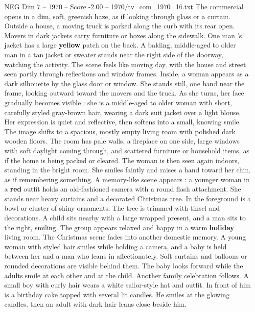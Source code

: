 \begin{textsample}{NEG Dim 7 – 1970 – Score -2.00 – 1970/tv\_com\_1970\_16.txt}  \label{ex:f7_neg_068}
The commercial opens in a dim, soft, greenish haze, as if looking through glass or a curtain.
Outside a house, a moving truck is parked along the curb with its rear open.
Movers in dark jackets carry furniture or boxes along the sidewalk.
One man ’s jacket has a large \textbf{yellow} patch on the back.
A balding, middle-aged to older man in a tan jacket or sweater stands near the right side of the doorway, watching the activity.
The scene feels like moving day, with the house and street seen partly through reflections and window frames.
Inside, a woman appears as a dark silhouette by the glass door or window.
She stands still, one hand near the frame, looking outward toward the movers and the truck.
As she turns, her face gradually becomes visible : she is a middle-aged to older woman with short, carefully styled gray-brown hair, wearing a dark suit jacket over a light blouse.
Her expression is quiet and reflective, then softens into a small, knowing smile.
The image shifts to a spacious, mostly empty living room with polished dark wooden floors.
The room has pale walls, a fireplace on one side, large windows with soft daylight coming through, and scattered furniture or household items, as if the home is being packed or cleared.
The woman is then seen again indoors, standing in the bright room.
She smiles faintly and raises a hand toward her chin, as if remembering something.
A memory-like scene appears : a younger woman in a \textbf{red} outfit holds an old-fashioned camera with a round flash attachment.
She stands near heavy curtains and a decorated Christmas tree.
In the foreground is a bowl or cluster of shiny ornaments.
The tree is trimmed with tinsel and decorations.
A child sits nearby with a large wrapped present, and a man sits to the right, smiling.
The group appears relaxed and happy in a warm \textbf{holiday} living room.
The Christmas scene fades into another domestic memory.
A young woman with styled hair smiles while holding a camera, and a baby is held between her and a man who leans in affectionately.
Soft curtains and balloons or rounded decorations are visible behind them.
The baby looks forward while the adults smile at each other and at the child.
Another family celebration follows.
A small boy with curly hair wears a white sailor-style hat and outfit.
In front of him is a birthday cake topped with several lit candles.
He smiles at the glowing candles, then an adult with dark hair leans close beside him.

\end{textsample}
